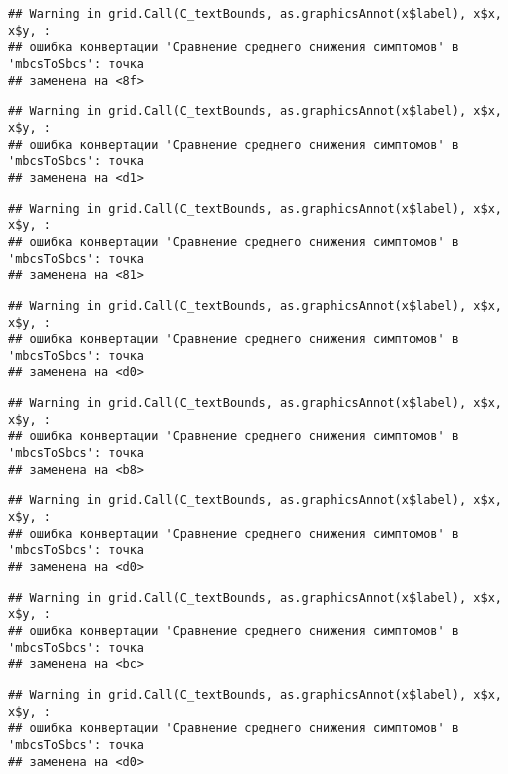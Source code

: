 \documentclass[
]{article}
\begin{document}
\begin{verbatim}
## Warning in grid.Call(C_textBounds, as.graphicsAnnot(x$label), x$x, x$y, :
## ошибка конвертации 'Сравнение среднего снижения симптомов' в 'mbcsToSbcs': точка
## заменена на <8f>
\end{verbatim}

\begin{verbatim}
## Warning in grid.Call(C_textBounds, as.graphicsAnnot(x$label), x$x, x$y, :
## ошибка конвертации 'Сравнение среднего снижения симптомов' в 'mbcsToSbcs': точка
## заменена на <d1>
\end{verbatim}

\begin{verbatim}
## Warning in grid.Call(C_textBounds, as.graphicsAnnot(x$label), x$x, x$y, :
## ошибка конвертации 'Сравнение среднего снижения симптомов' в 'mbcsToSbcs': точка
## заменена на <81>
\end{verbatim}

\begin{verbatim}
## Warning in grid.Call(C_textBounds, as.graphicsAnnot(x$label), x$x, x$y, :
## ошибка конвертации 'Сравнение среднего снижения симптомов' в 'mbcsToSbcs': точка
## заменена на <d0>
\end{verbatim}

\begin{verbatim}
## Warning in grid.Call(C_textBounds, as.graphicsAnnot(x$label), x$x, x$y, :
## ошибка конвертации 'Сравнение среднего снижения симптомов' в 'mbcsToSbcs': точка
## заменена на <b8>
\end{verbatim}

\begin{verbatim}
## Warning in grid.Call(C_textBounds, as.graphicsAnnot(x$label), x$x, x$y, :
## ошибка конвертации 'Сравнение среднего снижения симптомов' в 'mbcsToSbcs': точка
## заменена на <d0>
\end{verbatim}

\begin{verbatim}
## Warning in grid.Call(C_textBounds, as.graphicsAnnot(x$label), x$x, x$y, :
## ошибка конвертации 'Сравнение среднего снижения симптомов' в 'mbcsToSbcs': точка
## заменена на <bc>
\end{verbatim}

\begin{verbatim}
## Warning in grid.Call(C_textBounds, as.graphicsAnnot(x$label), x$x, x$y, :
## ошибка конвертации 'Сравнение среднего снижения симптомов' в 'mbcsToSbcs': точка
## заменена на <d0>
\end{verbatim}
\end{document}
